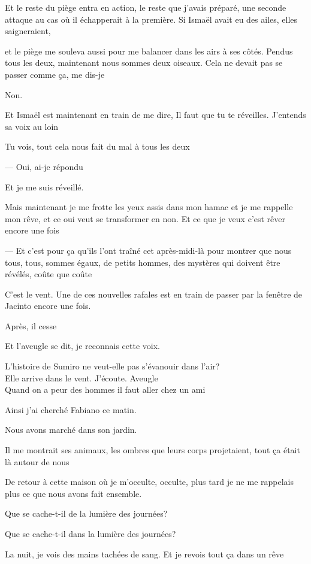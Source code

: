 Et le reste du piège entra en action, le reste que j'avais préparé, une
seconde attaque au cas où il échapperait à la première. Si Ismaël avait
eu des ailes, elles saigneraient,

et le piège me souleva aussi pour me balancer dans les airs à ses côtés.
Pendus tous les deux, maintenant nous sommes deux oiseaux. Cela ne
devait pas se passer comme ça, me dis-je

Non.

Et Ismaël est maintenant en train de me dire, Il faut que tu te
réveilles. J'entends sa voix au loin

Tu vois, tout cela nous fait du mal à tous les deux

--- Oui, ai-je répondu

Et je me suis réveillé.

Mais maintenant je me frotte les yeux assis dans mon hamac et je me
rappelle mon rêve, et ce oui veut se transformer en non. Et ce que je
veux c'est rêver encore une fois

--- Et c'est pour ça qu'ils l'ont traîné cet après-midi-là pour montrer
que nous tous, tous, sommes égaux, de petits hommes, des mystères qui
doivent être révélés, coûte que coûte

C'est le vent. Une de ces nouvelles rafales est en train de passer par
la fenêtre de Jacinto encore une fois.

Après, il cesse

Et l'aveugle se dit, je reconnais cette voix.

L'histoire de Sumiro ne veut-elle pas s'évanouir dans l'air?\\

Elle arrive dans le vent. J'écoute. Aveugle\\

Quand on a peur des hommes il faut aller chez un ami

Ainsi j'ai cherché Fabiano ce matin.

Nous avons marché dans son jardin.

Il me montrait ses animaux, les ombres que leurs corps projetaient, tout
ça était là autour de nous

De retour à cette maison où je m'occulte, occulte, plus tard je ne me
rappelais plus ce que nous avons fait ensemble.

Que se cache-t-il de la lumière des journées?

Que se cache-t-il dans la lumière des journées?

La nuit, je vois des mains tachées de sang. Et je revois tout ça dans un
rêve

